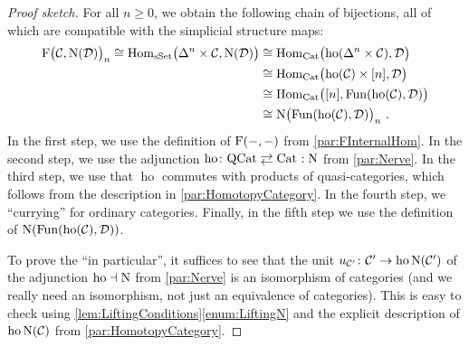 \begin{proof}[Proof sketch]
	For all $n\geqslant 0$, we obtain the following chain of bijections, all of which are compatible with the simplicial structure maps:
	\begin{align*}
		\F\lef(\Cc,\N(\Dd)\righ)_n\cong \Hom_{\cat{sSet}}\lef(\Delta^n\times \Cc,\N(\Dd)\righ)&\cong \Hom_{\cat{Cat}}\lef(\operatorname{ho}(\Delta^n\times \Cc),\Dd\righ)\\
		&\cong \Hom_{\cat{Cat}}\lef(\operatorname{ho}(\Cc)\times[n],\Dd\righ)\\
		&\cong \Hom_{\cat{Cat}}\lef([n],\Fun(\operatorname{ho}(\Cc),\Dd)\righ)\\
		&\cong \N\lef(\Fun(\operatorname{ho}(\Cc),\Dd)\righ)_n\,.
	\end{align*} 
	In the first step, we use the definition of $\operatorname{F}(-,-)$ from \cref{par:FInternalHom}. In the second step, we use the adjunction $\operatorname{ho}\colon\cat{QCat}\shortdoublelrmorphism \cat{Cat}\noloc\N$ from \cref{par:Nerve}. In the third step, we use that $\operatorname{ho}$ commutes with products of quasi-categories, which follows from the description in \cref{par:HomotopyCategory}. In the fourth step, we \enquote{currying} for ordinary categories. Finally, in the fifth step we use the definition of $\operatorname{N}(\operatorname{Fun}(\operatorname{ho}(\mathcal{C}),\mathcal{D}))$.
	
	To prove the \enquote{in particular}, it suffices to see that the unit $u_{\mathcal{C}'}\colon\mathcal{C}'\rightarrow \operatorname{ho}\operatorname{N}(\mathcal{C}')$ of the adjunction $\operatorname{ho}\dashv \operatorname{N}$ from \cref{par:Nerve} is an isomorphism of categories (and we really need an isomorphism, not just an equivalence of categories). This is easy to check using \cref{lem:LiftingConditions}\cref{enum:LiftingN} and the explicit description of $\operatorname{ho}\operatorname{N}(\mathcal{C})$ from \cref{par:HomotopyCategory}.%
\end{proof}
